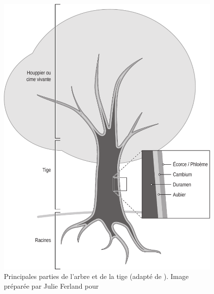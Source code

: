 \begin{figure}[ht]
\centering
\includegraphics[scale=0.6]{img/ch2_partie_arbre}
\caption{Principales parties de l'arbre et de la tige (adapté de \cite{hoadley1990identifying}). Image préparée par Julie Ferland pour \cite{achim2010dendroecologie}}
\label{arbre}
\end{figure}

